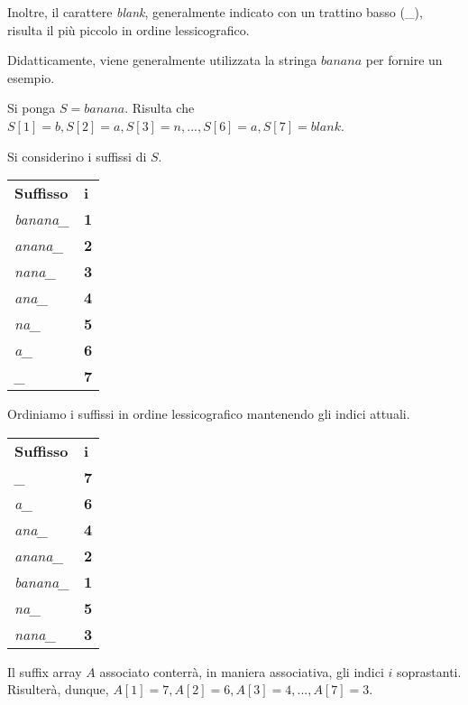 Inoltre, il carattere \textit{blank}, generalmente indicato con un trattino basso (\_), risulta il più piccolo in ordine lessicografico.


Didatticamente, viene generalmente utilizzata la stringa $banana$ per fornire un esempio.

\vspace{3mm}

Si ponga $S=banana$. Risulta che $S[1]=b, S[2]=a, S[3]=n, ..., S[6]=a, S[7]=blank$.

\vspace{3mm}

Si considerino i suffissi di $S$.

\begin{table}[H]
\centering
\begin{tabular}{ll}
\textbf{Suffisso} & \textbf{i} \\
\textit{banana\_} & \textbf{1} \\
\textit{anana\_}  & \textbf{2} \\
\textit{nana\_}   & \textbf{3} \\
\textit{ana\_}    & \textbf{4} \\
\textit{na\_}     & \textbf{5} \\
\textit{a\_}      & \textbf{6} \\
\textit{\_}       & \textbf{7}
\end{tabular}
\end{table}

Ordiniamo i suffissi in ordine lessicografico mantenendo gli indici attuali.

\begin{table}[H]
\centering
\begin{tabular}{ll}
\textbf{Suffisso} & \textbf{i} \\
\textit{\_}       & \textbf{7} \\
\textit{a\_}      & \textbf{6} \\
\textit{ana\_}    & \textbf{4} \\
\textit{anana\_}  & \textbf{2} \\
\textit{banana\_} & \textbf{1} \\
\textit{na\_}     & \textbf{5} \\
\textit{nana\_}   & \textbf{3}
\end{tabular}
\end{table}

Il suffix array $A$ associato conterrà, in maniera associativa, gli indici $i$ soprastanti. Risulterà, dunque, $A[1]=7, A[2]=6, A[3]=4, ..., A[7]=3$.

